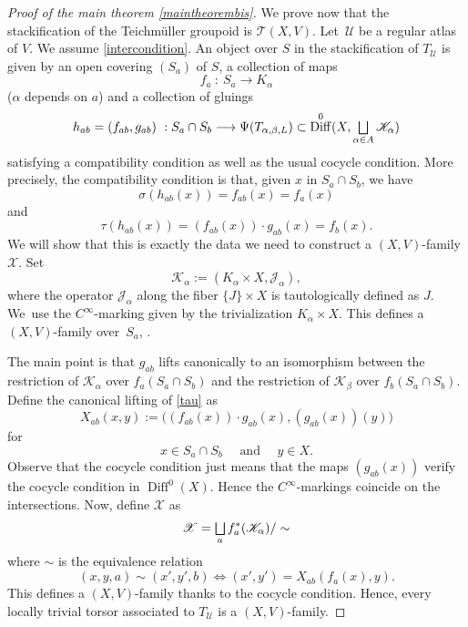 \documentclass[10pt]{amsart}
\let\mathcal\mathscr
\let\oldbigsqcup\bigsqcup
\renewcommand{\bigsqcup}{\mathop{\textstyle\oldbigsqcup}\displaylimits}
\DeclareMathOperator{\Diff}{Diff}
\theoremstyle{plain}
\theoremstyle{definition}
\theoremstyle{remark}
\numberwithin{equation}{section}
\newcommand{\DK}{\Diff^0(X,\bigsqcup_{\alpha\in A}\mathcal K_\alpha)}
\let\uniondisjointe\bigsqcup
\begin{document}
\begin{proof}[Proof of the main theorem \ref{maintheorembis}]
We prove now that the stackification of the Teichmüller groupoid is $\mathcal T(X,V)$.
Let~$\mathcal U$ be a regular atlas of $V$.
We assume \eqref{intercondition}.
An object over $S$ in the stackification of $T_{\mathcal U}$ is given by an open covering $(S_a)$ of $S$, a collection of maps
\begin{equation}
\label{fa}
f_a \ :\ S_a\longrightarrow K_{\alpha}
\end{equation}
($\alpha$ depends on $a$) and a collection of gluings
\begin{equation}
\label{hab}
h_{ab}=(f_{ab},g_{ab})\ : S_a\cap S_b \longrightarrow \Psi(T_{\alpha, \beta, L})\subset \DK
\end{equation}
satisfying a compatibility condition as well as the usual cocycle condition. More precisely, the compatibility condition is that,
given $x$ in $S_a\cap S_b$, we have
\begin{equation}
\label{sigma}
\sigma (h_{ab}(x))=f_{ab}(x)=f_a(x)
\end{equation}
and
\begin{equation}
\label{tau}
\tau(h_{ab}(x))=( f_{ab}(x))\cdot g_{ab}(x)=f_b(x).
\end{equation}
We will show that this is exactly the data we need to construct a $(X,V)$-family $\mathcal X$. Set
\begin{equation}
\label{XV1}
\mathcal K_{\alpha}:=(K_{\alpha}\times X, \mathcal J_\alpha),
\end{equation}
where the operator $\mathcal J_\alpha$ along the fiber $\{J\}\times X$ is tautologically defined as $J$. We~use the $C^\infty$-marking given by the trivialization $K_\alpha\times X$. This defines a $(X, V)$-family over~$S_a$, \cf \cite{Ku3}.

The main point is that $g_{ab}$ lifts canonically to an isomorphism between the restriction of $\mathcal K_{\alpha}$ over $f_a(S_a\cap S_b)$ and the restriction of $\mathcal K_{\beta}$ over $f_b(S_a\cap S_b)$. Define the canonical lifting of \eqref{tau} as
\begin{equation}
\label{clifting}
X_{ab}(x,y):=\big (( f_{ab}(x))\cdot g_{ab}(x),(g_{ab}(x))(y)\big )
\end{equation}
for
\begin{equation}
\label{liftingcond}
x\in S_a\cap S_b\quad\text{ and }\quad y\in X.
\end{equation}
Observe that the cocycle condition just means that the maps
$(g_{ab}(x))$
verify the cocycle condition in $\Diff^0(X)$. Hence the $C^\infty$-markings coincide on the intersections. Now, define $\mathcal X$ as
\begin{equation}
\label{defX}
\mathcal X=\uniondisjointe_a f_a^*(\mathcal K_{\alpha})/\sim
\end{equation}
where $\sim$ is the equivalence relation
\begin{equation}
\label{XVequiv}
(x,y,a)\sim (x',y',b)\iff (x',y')=X_{ab}(f_a(x),y).
\end{equation}
This defines a $(X,V)$-family thanks to the cocycle condition. Hence, every locally trivial torsor associated to $T_{\mathcal U}$ is a $(X,V)$-family.


\end{proof}
\end{document}
